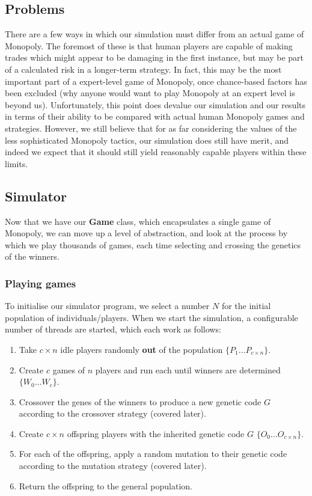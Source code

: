 \documentclass[11pt,a4paper,twocolumn]{scrartcl}
\begin{document}
\subsection{Problems}

There are a few ways in which our simulation must differ from an actual game of Monopoly. The foremost of these is that human players are capable of making trades which might appear to be damaging in the first instance, but may be part of a calculated risk in a longer-term strategy. In fact, this may be the most important part of a expert-level game of Monopoly, once chance-based factors has been excluded (why anyone would want to play Monopoly at an expert level is beyond us). Unfortunately, this point does devalue our simulation and our results in terms of their ability to be compared with actual human Monopoly games and strategies. However, we still believe that for as far considering the values of the less sophisticated Monopoly tactics, our simulation does still have merit, and indeed we expect that it should still yield reasonably capable players within these limits.

\subsection{Simulator}

Now that we have our \textbf{Game} class, which encapsulates a single game of Monopoly, we can move up a level of abstraction, and look at the process by which we play thousands of games, each time selecting and crossing the genetics of the winners.

\subsubsection{Playing games}

To initialise our simulator program, we select a number $N$ for the initial population of individuals/players. When we start the simulation, a configurable number of threads are started, which each work as follows:

\begin{enumerate}
\item Take $c \times n$ idle players randomly \textbf{out} of the population $\{P_1 \ldots P_{c \times n}\}$.
\item Create $c$ games of $n$ players and run each until winners are determined $\{W_0 \ldots W_c\}$.
\item Crossover the genes of the winners to produce a new genetic code $G$ according to the crossover strategy (covered later).
\item Create $c \times n$ offspring players with the inherited genetic code $G$ $\{O_0 \ldots O_{c \times n}\}$.
\item For each of the offspring, apply a random mutation to their genetic code according to the mutation strategy (covered later).
\item Return the offspring to the general population.
\end{enumerate}
\end{document}
